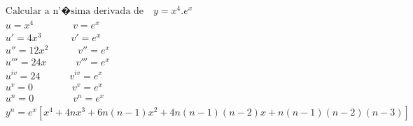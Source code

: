 \begin{ex}
\begin{align}
&\text{Calcular a n'�sima derivada de} \quad y=x^4.e^{x}\nonumber\\
&u = x^4 \quad\quad\quad\quad v=e^{x}\nonumber\\
&u'=4x^3 \quad\quad\quad v'=e^{x}\nonumber\\
&u''=12x^2 \quad\quad\quad v''=e^{x}\nonumber\\
&u'''=24x \quad\quad\quad v'''=e^{x}\nonumber\\
&u^{iv}=24 \quad\quad\quad v^{iv}=e^{x}\nonumber\\
&u^{v}=0 \quad\quad\quad\quad v^{v}=e^{x}\nonumber\\
&u^{n}=0 \quad\quad\quad\quad v^{n}=e^{x}\nonumber\\
&y^{n}=e^{x}[x^4+4nx^3+6n(n-1)x^2+4n(n-1)(n-2)x+n(n-1)(n-2)(n-3)]\nonumber
\end{align}
\end{ex}